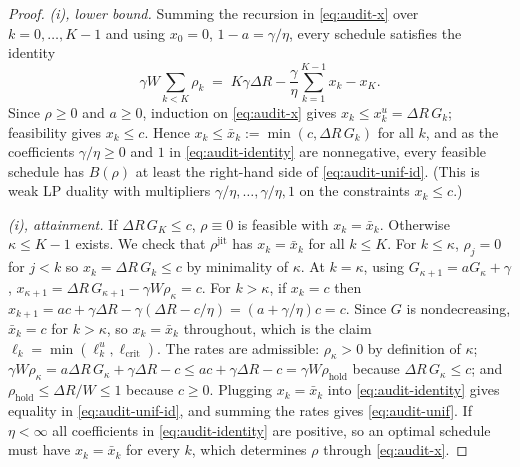\begin{proof}
\emph{(i), lower bound.} Summing the recursion in \eqref{eq:audit-x} over
$k=0,\dots,K-1$ and using $x_0=0$, $1-a=\gamma/\eta$, every schedule satisfies
the identity
\begin{equation}\label{eq:audit-identity}
  \gamma W\sum_{k<K}\rho_k \;=\; K\gamma\Delta R-\frac{\gamma}{\eta}\sum_{k=1}^{K-1}x_k-x_K .
\end{equation}
Since $\rho\ge0$ and $a\ge0$, induction on \eqref{eq:audit-x} gives
$x_k\le x^u_k=\Delta R\,G_k$; feasibility gives $x_k\le c$. Hence
$x_k\le\bar x_k:=\min(c,\Delta R\,G_k)$ for all $k$, and as the coefficients
$\gamma/\eta\ge0$ and $1$ in \eqref{eq:audit-identity} are nonnegative, every
feasible schedule has $B(\rho)$ at least the right-hand side of
\eqref{eq:audit-unif-id}. (This is weak LP duality with multipliers
$\gamma/\eta,\dots,\gamma/\eta,1$ on the constraints $x_k\le c$.)

\emph{(i), attainment.} If $\Delta R\,G_K\le c$, $\rho\equiv0$ is feasible with
$x_k=\bar x_k$. Otherwise $\kappa\le K-1$ exists. We check that
$\rho^{\mathrm{jit}}$ has $x_k=\bar x_k$ for all $k\le K$. For $k\le\kappa$,
$\rho_j=0$ for $j<k$ so $x_k=\Delta R\,G_k\le c$ by minimality of $\kappa$.
At $k=\kappa$, using $G_{\kappa+1}=aG_\kappa+\gamma$,
$x_{\kappa+1}=\Delta R\,G_{\kappa+1}-\gamma W\rho_\kappa=c$. For $k>\kappa$, if
$x_k=c$ then $x_{k+1}=ac+\gamma\Delta R-\gamma(\Delta R-c/\eta)=(a+\gamma/\eta)c=c$.
Since $G$ is nondecreasing, $\bar x_k=c$ for $k>\kappa$, so $x_k=\bar x_k$
throughout, which is the claim $\ell_k=\min(\ell^u_k,\ell_{\mathrm{crit}})$.
The rates are admissible: $\rho_\kappa>0$ by definition of $\kappa$;
$\gamma W\rho_\kappa=a\Delta R\,G_\kappa+\gamma\Delta R-c\le ac+\gamma\Delta R-c
=\gamma W\rho_{\mathrm{hold}}$ because $\Delta R\,G_\kappa\le c$; and
$\rho_{\mathrm{hold}}\le\Delta R/W\le1$ because $c\ge0$. Plugging
$x_k=\bar x_k$ into \eqref{eq:audit-identity} gives equality in
\eqref{eq:audit-unif-id}, and summing the rates gives \eqref{eq:audit-unif}.
If $\eta<\infty$ all coefficients in \eqref{eq:audit-identity} are positive, so
an optimal schedule must have $x_k=\bar x_k$ for every $k$, which determines
$\rho$ through \eqref{eq:audit-x}.


\end{proof}
